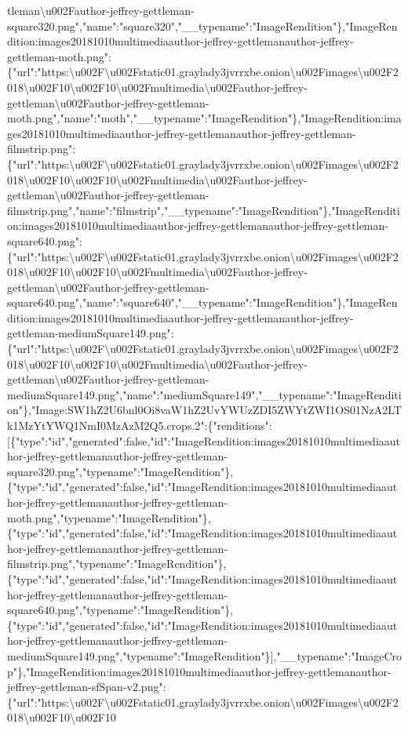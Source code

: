 tleman\textbackslash{}u002Fauthor-jeffrey-gettleman-square320.png","name":"square320","\_\_typename":"ImageRendition"\},"ImageRendition:images20181010multimediaauthor-jeffrey-gettlemanauthor-jeffrey-gettleman-moth.png":\{"url":"https:\textbackslash{}u002F\textbackslash{}u002Fstatic01.graylady3jvrrxbe.onion\textbackslash{}u002Fimages\textbackslash{}u002F2018\textbackslash{}u002F10\textbackslash{}u002F10\textbackslash{}u002Fmultimedia\textbackslash{}u002Fauthor-jeffrey-gettleman\textbackslash{}u002Fauthor-jeffrey-gettleman-moth.png","name":"moth","\_\_typename":"ImageRendition"\},"ImageRendition:images20181010multimediaauthor-jeffrey-gettlemanauthor-jeffrey-gettleman-filmstrip.png":\{"url":"https:\textbackslash{}u002F\textbackslash{}u002Fstatic01.graylady3jvrrxbe.onion\textbackslash{}u002Fimages\textbackslash{}u002F2018\textbackslash{}u002F10\textbackslash{}u002F10\textbackslash{}u002Fmultimedia\textbackslash{}u002Fauthor-jeffrey-gettleman\textbackslash{}u002Fauthor-jeffrey-gettleman-filmstrip.png","name":"filmstrip","\_\_typename":"ImageRendition"\},"ImageRendition:images20181010multimediaauthor-jeffrey-gettlemanauthor-jeffrey-gettleman-square640.png":\{"url":"https:\textbackslash{}u002F\textbackslash{}u002Fstatic01.graylady3jvrrxbe.onion\textbackslash{}u002Fimages\textbackslash{}u002F2018\textbackslash{}u002F10\textbackslash{}u002F10\textbackslash{}u002Fmultimedia\textbackslash{}u002Fauthor-jeffrey-gettleman\textbackslash{}u002Fauthor-jeffrey-gettleman-square640.png","name":"square640","\_\_typename":"ImageRendition"\},"ImageRendition:images20181010multimediaauthor-jeffrey-gettlemanauthor-jeffrey-gettleman-mediumSquare149.png":\{"url":"https:\textbackslash{}u002F\textbackslash{}u002Fstatic01.graylady3jvrrxbe.onion\textbackslash{}u002Fimages\textbackslash{}u002F2018\textbackslash{}u002F10\textbackslash{}u002F10\textbackslash{}u002Fmultimedia\textbackslash{}u002Fauthor-jeffrey-gettleman\textbackslash{}u002Fauthor-jeffrey-gettleman-mediumSquare149.png","name":"mediumSquare149","\_\_typename":"ImageRendition"\},"Image:SW1hZ2U6bnl0Oi8vaW1hZ2UvYWUzZDI5ZWYtZWI1OS01NzA2LTk1MzYtYWQ1NmI0MzAzM2Q5.crops.2":\{"renditions":{[}\{"type":"id","generated":false,"id":"ImageRendition:images20181010multimediaauthor-jeffrey-gettlemanauthor-jeffrey-gettleman-square320.png","typename":"ImageRendition"\},\{"type":"id","generated":false,"id":"ImageRendition:images20181010multimediaauthor-jeffrey-gettlemanauthor-jeffrey-gettleman-moth.png","typename":"ImageRendition"\},\{"type":"id","generated":false,"id":"ImageRendition:images20181010multimediaauthor-jeffrey-gettlemanauthor-jeffrey-gettleman-filmstrip.png","typename":"ImageRendition"\},\{"type":"id","generated":false,"id":"ImageRendition:images20181010multimediaauthor-jeffrey-gettlemanauthor-jeffrey-gettleman-square640.png","typename":"ImageRendition"\},\{"type":"id","generated":false,"id":"ImageRendition:images20181010multimediaauthor-jeffrey-gettlemanauthor-jeffrey-gettleman-mediumSquare149.png","typename":"ImageRendition"\}{]},"\_\_typename":"ImageCrop"\},"ImageRendition:images20181010multimediaauthor-jeffrey-gettlemanauthor-jeffrey-gettleman-sfSpan-v2.png":\{"url":"https:\textbackslash{}u002F\textbackslash{}u002Fstatic01.graylady3jvrrxbe.onion\textbackslash{}u002Fimages\textbackslash{}u002F2018\textbackslash{}u002F10\textbackslash{}u002F10\textbac